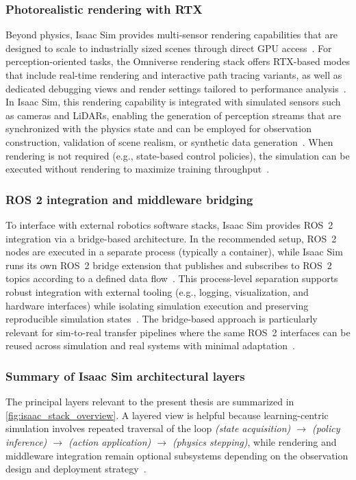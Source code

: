 \subsubsection{Photorealistic rendering with RTX}
Beyond physics, Isaac Sim provides multi-sensor rendering capabilities that are designed to scale to industrially sized scenes through direct \ac{GPU} access~\cite{isaac_sim_510_overview}.
For perception-oriented tasks, the Omniverse rendering stack offers RTX-based modes that include real-time rendering and interactive path tracing variants, as well as dedicated debugging views and render settings tailored to performance analysis~\cite{omniverse_rtx_renderer_doc}.
In Isaac Sim, this rendering capability is integrated with simulated sensors such as cameras and LiDARs, enabling the generation of perception streams that are synchronized with the physics state and can be employed for observation construction, validation of scene realism, or synthetic data generation~\cite{isaac_sim_510_overview}.
When rendering is not required (e.g., state-based control policies), the simulation can be executed without rendering to maximize training throughput~\cite{isaac_sim_510_physics_fundamentals}.

\subsubsection{ROS 2 integration and middleware bridging}
To interface with external robotics software stacks, Isaac Sim provides \ac{ROS}~2 integration via a bridge-based architecture.
In the recommended setup, \ac{ROS}~2 nodes are executed in a separate process (typically a container), while Isaac Sim runs its own \ac{ROS}~2 bridge extension that publishes and subscribes to \ac{ROS}~2 topics according to a defined data flow~\cite{isaac_sim_ros2_reference_architecture_510}.
This process-level separation supports robust integration with external tooling (e.g., logging, visualization, and hardware interfaces) while isolating simulation execution and preserving reproducible simulation states~\cite{isaac_sim_ros2_reference_architecture_510}.
The bridge-based approach is particularly relevant for sim-to-real transfer pipelines where the same \ac{ROS}~2 interfaces can be reused across simulation and real systems with minimal adaptation~\cite{isaac_sim_ros2_reference_architecture_510}.

\subsubsection{Summary of Isaac Sim architectural layers}
The principal layers relevant to the present thesis are summarized in \autoref{fig:isaac_stack_overview}.
A layered view is helpful because learning-centric simulation involves repeated traversal of the loop \emph{(state acquisition) $\rightarrow$ (policy inference) $\rightarrow$ (action application) $\rightarrow$ (physics stepping)}, while rendering and middleware integration remain optional subsystems depending on the observation design and deployment strategy~\cite{isaac_sim_510_physics_fundamentals,isaac_sim_ros2_reference_architecture_510}.

